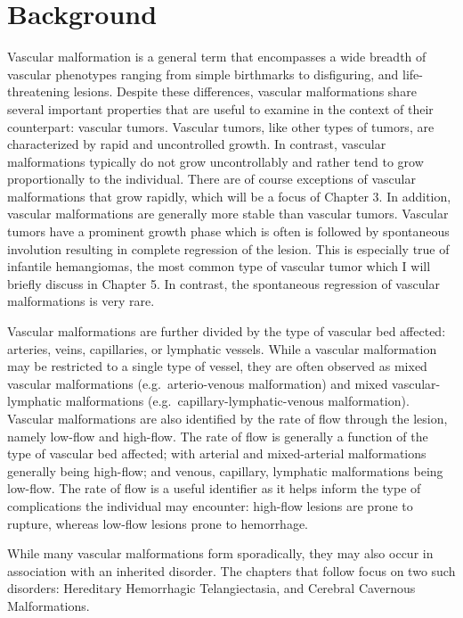 \section{Background}
Vascular malformation is a general term that encompasses a wide breadth of vascular phenotypes ranging from simple birthmarks to disfiguring, and life-threatening lesions. Despite these differences, vascular malformations share several important properties that are useful to examine in the context of their counterpart: vascular tumors. Vascular tumors, like other types of tumors, are characterized by rapid and uncontrolled growth. In contrast, vascular malformations typically do not grow uncontrollably and rather tend to grow proportionally to the individual. There are of course exceptions of vascular malformations that grow rapidly, which will be a focus of Chapter 3. In addition, vascular malformations are generally more stable than vascular tumors. Vascular tumors have a prominent growth phase which is often is followed by spontaneous involution resulting in complete regression of the lesion. This is especially true of infantile hemangiomas, the most common type of vascular tumor which I will briefly discuss in Chapter 5. In contrast, the spontaneous regression of vascular malformations is very rare.

Vascular malformations are further divided by the type of vascular bed affected: arteries, veins, capillaries, or lymphatic vessels. While a vascular malformation may be restricted to a single type of vessel, they are often observed as mixed vascular malformations (e.g.~arterio-venous malformation) and mixed vascular-lymphatic malformations (e.g.~capillary-lymphatic-venous malformation). Vascular malformations are also identified by the rate of flow through the lesion, namely low-flow and high-flow. The rate of flow is generally a function of the type of vascular bed affected; with arterial and mixed-arterial malformations generally being high-flow; and venous, capillary, lymphatic malformations being low-flow. The rate of flow is a useful identifier as it helps inform the type of complications the individual may encounter: high-flow lesions are prone to rupture, whereas low-flow lesions prone to hemorrhage.

While many vascular malformations form sporadically, they may also occur in association with an inherited disorder. The chapters that follow focus on two such disorders: Hereditary Hemorrhagic Telangiectasia, and Cerebral Cavernous Malformations. 




